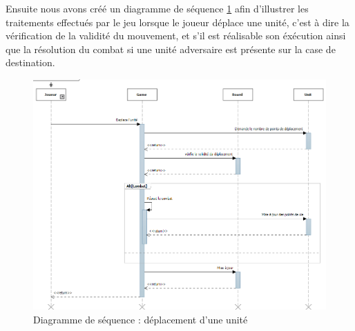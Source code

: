 \bigbreak
Ensuite nous avons créé un diagramme de séquence \ref{fig:seq_DeplacementUnite} afin d'illustrer les traitements effectués par le jeu lorsque le joueur déplace une unité, c'est à dire la vérification de la validité du mouvement, et s'il est réalisable son éxécution ainsi que la résolution du combat si une unité adversaire est présente sur la case de destination.
\begin{figure}[!h]
\centering
\includegraphics[width=\textwidth]{Parties/Images/seq_DeplacementUnite.png}
\caption{Diagramme de séquence : déplacement d'une unité}
\label{fig:seq_DeplacementUnite}
\end{figure}
